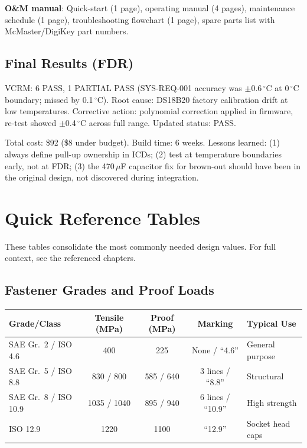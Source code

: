 \documentclass[11pt,letterpaper,twoside,openany]{book}
\newcommand{\degC}{\ensuremath{{}^{\circ}\text{C}}}
\begin{document}
\textbf{O\&M manual}: Quick-start (1 page), operating manual (4 pages), maintenance schedule (1 page), troubleshooting flowchart (1 page), spare parts list with McMaster/DigiKey part numbers.

\section*{Final Results (FDR)}
VCRM: 6 PASS, 1 PARTIAL PASS (SYS-REQ-001 accuracy was $\pm$0.6\,\degC{} at 0\,\degC{} boundary; missed by 0.1\,\degC{}). Root cause: DS18B20 factory calibration drift at low temperatures. Corrective action: polynomial correction applied in firmware, re-test showed $\pm$0.4\,\degC{} across full range. Updated status: PASS.

Total cost: \$92 (\$8 under budget). Build time: 6 weeks. Lessons learned: (1) always define pull-up ownership in ICDs; (2) test at temperature boundaries early, not at FDR; (3) the 470\,$\mu$F capacitor fix for brown-out should have been in the original design, not discovered during integration.

\chapter*{Quick Reference Tables}

These tables consolidate the most commonly needed design values. For full context, see the referenced chapters.

\section*{Fastener Grades and Proof Loads}
\begin{table}[htbp]\centering\small
\begin{tabularx}{\textwidth}{l c c c l}
\toprule
\textbf{Grade/Class} & \textbf{Tensile (MPa)} & \textbf{Proof (MPa)} & \textbf{Marking} & \textbf{Typical Use} \\
\midrule
SAE Gr.~2 / ISO 4.6 & 400 & 225 & None / ``4.6'' & General purpose \\
SAE Gr.~5 / ISO 8.8 & 830 / 800 & 585 / 640 & 3 lines / ``8.8'' & Structural \\
SAE Gr.~8 / ISO 10.9 & 1035 / 1040 & 895 / 940 & 6 lines / ``10.9'' & High strength \\
ISO 12.9 & 1220 & 1100 & ``12.9'' & Socket head caps \\
\bottomrule
\end{tabularx}
\end{table}
\end{document}
